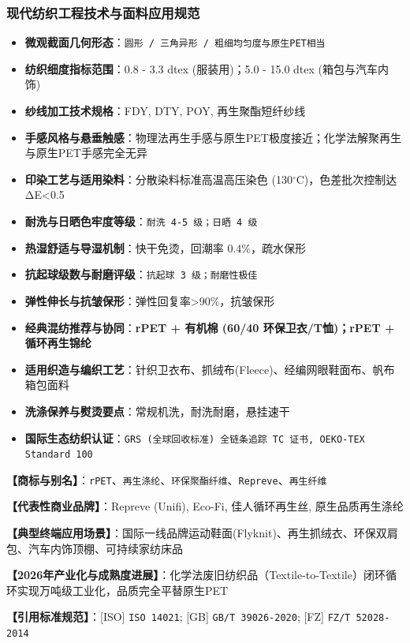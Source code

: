 \documentclass[11pt,openright,twoside,UTF8]{ctexbook}
\begin{document}
\subsubsection*{现代纺织工程技术与面料应用规范}
\begin{itemize} \setlength{\itemsep}{2pt}
    \item \textbf{微观截面几何形态}：\texttt{圆形 / 三角异形 / 粗细均匀度与原生PET相当}
    \item \textbf{纺织细度指标范围}：0.8 - 3.3 dtex (服装用)；5.0 - 15.0 dtex (箱包与汽车内饰)
    \item \textbf{纱线加工技术规格}：FDY, DTY, POY, 再生聚酯短纤纱线
    \item \textbf{手感风格与悬垂触感}：物理法再生手感与原生PET极度接近；化学法解聚再生与原生PET手感完全无异
    \item \textbf{印染工艺与适用染料}：分散染料标准高温高压染色 (130$^\circ\mathrm{C}$)，色差批次控制达 ΔE\textless{}0.5
    \item \textbf{耐洗与日晒色牢度等级}：\texttt{耐洗 4-5 级；日晒 4 级}
    \item \textbf{热湿舒适与导湿机制}：快干免烫，回潮率 0.4\%，疏水保形
    \item \textbf{抗起球级数与耐磨评级}：\texttt{抗起球 3 级；耐磨性极佳}
    \item \textbf{弹性伸长与抗皱保形}：弹性回复率\textgreater{}90\%，抗皱保形
    \item \textbf{经典混纺推荐与协同}：\textbf{rPET + 有机棉 (60/40 环保卫衣/T恤)；rPET + 循环再生锦纶}
    \item \textbf{适用织造与编织工艺}：针织卫衣布、抓绒布(Fleece)、经编网眼鞋面布、帆布箱包面料
    \item \textbf{洗涤保养与熨烫要点}：常规机洗，耐洗耐磨，悬挂速干
    \item \textbf{国际生态纺织认证}：\texttt{GRS (全球回收标准) 全链条追踪 TC 证书, OEKO-TEX Standard 100}
\end{itemize}
\vspace{0.2cm}

\noindent\textbf{【商标与别名】}：\texttt{rPET}、\texttt{再生涤纶}、\texttt{环保聚酯纤维}、\texttt{Repreve}、\texttt{再生纤维}\par
\noindent\textbf{【代表性商业品牌】}：Repreve (Unifi), Eco-Fi, 佳人循环再生丝, 原生品质再生涤纶\par
\noindent\textbf{【典型终端应用场景】}：国际一线品牌运动鞋面(Flyknit)、再生抓绒衣、环保双肩包、汽车内饰顶棚、可持续家纺床品\par
\noindent\textbf{【2026年产业化与成熟度进展】}：化学法废旧纺织品（Textile-to-Textile）闭环循环实现万吨级工业化，品质完全平替原生PET\par
\noindent\textbf{【引用标准规范】}：[ISO] \texttt{ISO 14021}; [GB] \texttt{GB/T 39026-2020}; [FZ] \texttt{FZ/T 52028-2014}\par
\vspace{0.5cm}
\end{document}
